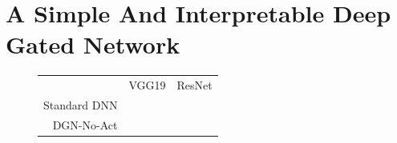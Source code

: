\section{A Simple And Interpretable Deep Gated  Network}\label{sec:interpret}
\begin{figure}[h]
\begin{minipage}{0.4\columnwidth}
\centering
{}
\end{minipage}
\begin{minipage}{0.4\columnwidth}
\begin{tabular}{rcc}
\toprule
&VGG19 & ResNet\\
Standard DNN& &\\
DGN-No-Act& & \\
\bottomrule
\end{tabular}
\end{minipage}
\end{figure}

